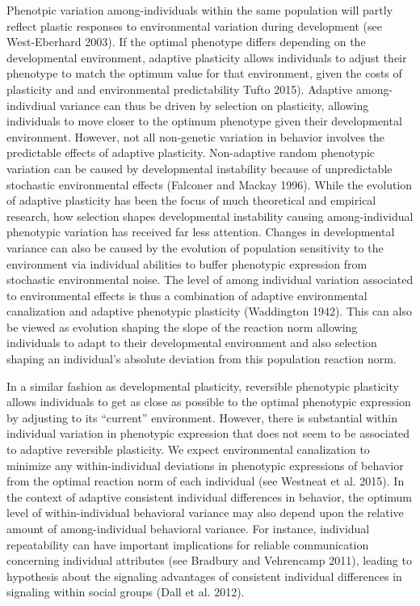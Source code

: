 \documentclass{article}
\begin{document}
Phenotpic variation among-individuals within the same population will partly reflect plastic responses to environmental variation during development (see West-Eberhard 2003). If the optimal phenotype differs depending on the developmental environment, adaptive plasticity allows individuals to adjust their phenotype to match the optimum value for that environment, given the costs of plasticity and and environmental predictability \citep{Botero2014} Tufto 2015). Adaptive among-indivdiual variance can thus be driven by selection on plasticity, allowing individuals to move closer to the optimum phenotype given their developmental environment. However, not all non-genetic variation in behavior involves the predictable effects of adaptive plasticity. Non-adaptive random phenotypic variation can be caused by developmental instability because of unpredictable stochastic environmental effects (Falconer and Mackay 1996). While the evolution of adaptive plasticity has been the focus of much theoretical and empirical research, how selection shapes developmental instability causing among-individual phenotypic variation has received far less attention. Changes in developmental variance can also be caused by the evolution of population sensitivity to the environment via individual abilities to buffer phenotypic expression from stochastic environmental noise. The level of among individual variation associated to environmental effects is thus a combination of adaptive environmental canalization and adaptive phenotypic plasticity (Waddington 1942). This can also be viewed as evolution shaping the slope of the reaction norm allowing individuals to adapt to their developmental environment and also selection shaping an individual's absolute deviation from this population reaction norm.
 
In a similar fashion as developmental plasticity, reversible phenotypic plasticity allows individuals to get as close as possible to the optimal phenotypic expression by adjusting to its “current” environment. However, there is substantial within individual variation in phenotypic expression that does not seem to be associated to adaptive reversible plasticity. We expect environmental canalization to minimize any within-individual deviations in phenotypic expressions of behavior from the optimal reaction norm of each individual (see Westneat et al. 2015). In the context of adaptive consistent individual differences in behavior, the optimum level of within-individual behavioral variance may also depend upon the relative amount of among-individual behavioral variance. For instance, individual repeatability can have important implications for reliable communication concerning individual attributes (see Bradbury and Vehrencamp 2011), leading to hypothesis about the signaling advantages of consistent individual differences in signaling within social groups (Dall et al. 2012). 
\end{document}

